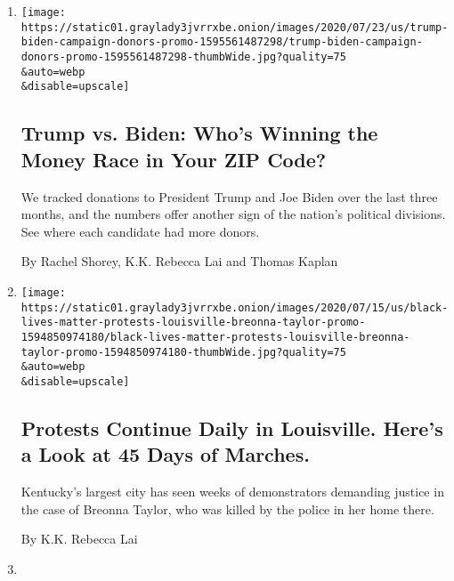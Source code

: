 \begin{enumerate}
\def\labelenumi{\arabic{enumi}.}
\item
  \href{/interactive/2020/07/24/us/politics/trump-biden-campaign-donors.html}{}

  \texttt{[image: https://static01.graylady3jvrrxbe.onion/images/2020/07/23/us/trump-biden-campaign-donors-promo-1595561487298/trump-biden-campaign-donors-promo-1595561487298-thumbWide.jpg?quality=75\\\&auto=webp\\\&disable=upscale]}

  \hypertarget{trump-vs-biden-whos-winning-the-money-race-in-your-zip-code}{%
  \subsection{Trump vs. Biden: Who's Winning the Money Race in Your ZIP
  Code?}\label{trump-vs-biden-whos-winning-the-money-race-in-your-zip-code}}

  We tracked donations to President Trump and Joe Biden over the last
  three months, and the numbers offer another sign of the nation's
  political divisions. See where each candidate had more donors.

  By Rachel Shorey, K.K. Rebecca Lai and Thomas Kaplan
\item
  \href{/interactive/2020/07/16/us/black-lives-matter-protests-louisville-breonna-taylor.html}{}

  \texttt{[image: https://static01.graylady3jvrrxbe.onion/images/2020/07/15/us/black-lives-matter-protests-louisville-breonna-taylor-promo-1594850974180/black-lives-matter-protests-louisville-breonna-taylor-promo-1594850974180-thumbWide.jpg?quality=75\\\&auto=webp\\\&disable=upscale]}

  \hypertarget{protests-continue-daily-in-louisville-heres-a-look-at-45-days-of-marches}{%
  \subsection{Protests Continue Daily in Louisville. Here's a Look at 45
  Days of
  Marches.}\label{protests-continue-daily-in-louisville-heres-a-look-at-45-days-of-marches}}

  Kentucky's largest city has seen weeks of demonstrators demanding
  justice in the case of Breonna Taylor, who was killed by the police in
  her home there.

  By K.K. Rebecca Lai
\item
  \href{/es/interactive/2020/07/09/espanol/mundo/coronavirus-latinos-africanoamericanos-datos.html}{}


\end{enumerate}
